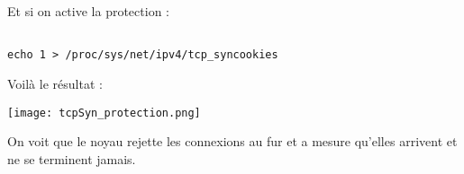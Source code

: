 \pagebreak
Et si on active la protection : 
\begin{lstlisting}[frame=single,style=Console]  % Start your code-block

echo 1 > /proc/sys/net/ipv4/tcp_syncookies
\end{lstlisting}

Voilà le résultat :
\begin{center} 
\hspace{15cm}
\texttt{[image: tcpSyn\_protection.png]}
\end{center}
\vspace{0.5cm}

On voit que le noyau rejette les connexions au fur et a mesure qu'elles arrivent et ne se terminent jamais.


